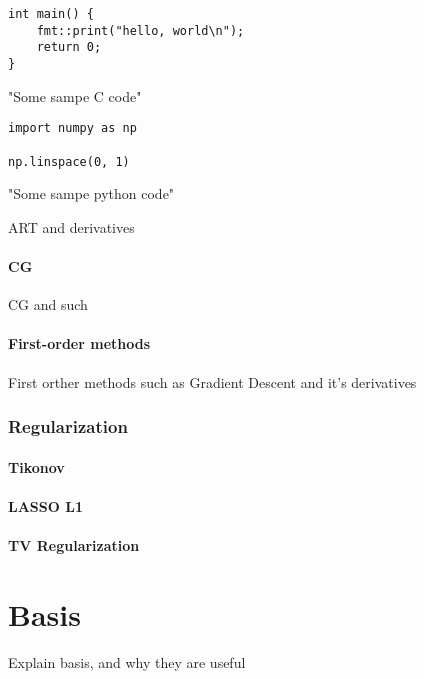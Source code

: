 \begin{listing}
    \begin{verbatim}
int main() {
    fmt::print("hello, world\n");
    return 0;
}
    \end{verbatim}
    \caption{"Some sampe C code"}
\end{listing}
\begin{listing}
    \begin{verbatim}
import numpy as np

np.linspace(0, 1)
    \end{verbatim}
    \caption{"Some sampe python code"}
\end{listing}

ART and derivatives

\subsubsection{CG}

CG and such
 
\subsubsection{First-order methods}

First orther methods such as Gradient Descent and it's derivatives

\subsection{Regularization}

\subsubsection{Tikonov}

\subsubsection{LASSO L1}

\subsubsection{TV Regularization}

\chapter{Basis}

Explain basis, and why they are useful

